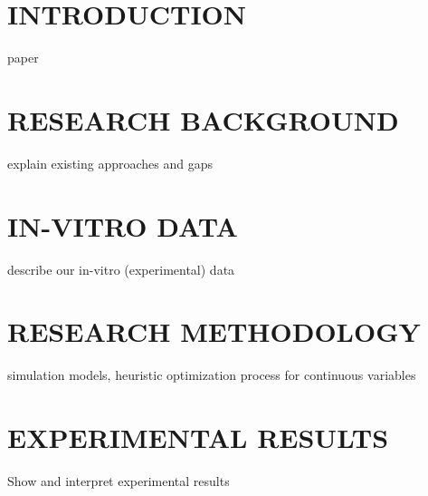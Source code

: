 \documentclass[journal]{IEEEtran}
\begin{document}
%
\IEEEpeerreviewmaketitle


\section{INTRODUCTION}

 paper \cite{ednie2019reduced}


\section{RESEARCH BACKGROUND}
explain existing approaches and gaps


\section{IN-VITRO DATA}
describe our in-vitro (experimental) data


\section{RESEARCH METHODOLOGY}
simulation models, heuristic optimization process for continuous variables


\section{EXPERIMENTAL RESULTS}
Show and interpret experimental results
\end{document}
